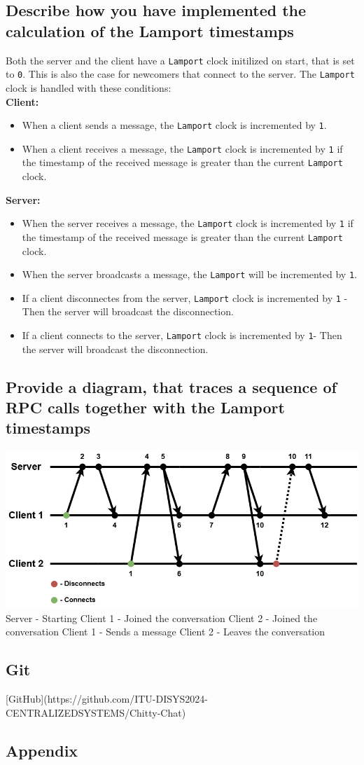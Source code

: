 \documentclass[a4paper,11pt]{article}
\begin{document}
\subsection*{Describe how you have implemented the calculation of the Lamport timestamps}
Both the server and the client have a \verb|Lamport| clock initilized on start, that is set to \verb|0|. This is also the case for newcomers that connect to the server. 
The \verb|Lamport| clock is handled with these conditions:\\
\textbf{Client:}
\begin{itemize}
    \item When a client sends a message, the \verb|Lamport| clock is incremented by \verb|1|.
    \item When a client receives a message, the \verb|Lamport| clock is incremented by \verb|1| if the timestamp of the received message is greater than the current \verb|Lamport| clock.
\end{itemize}
\textbf{Server:}
\begin{itemize}
    \item When the server receives a message, the \verb|Lamport| clock is incremented by \verb|1| if the timestamp of the received message is greater than the current \verb|Lamport| clock.
    \item When the server broadcasts a message, the \verb|Lamport| will be incremented by \verb|1|.
    \item If a client disconnectes from the server, \verb|Lamport| clock is incremented by \verb|1| - Then the server will broadcast the disconnection.
    \item If a client connects to the server, \verb|Lamport| clock is incremented by \verb|1|- Then the server will broadcast the disconnection.
\end{itemize}

\subsection*{Provide a diagram, that traces a sequence of RPC calls together with the Lamport timestamps}
\includegraphics[width=\textwidth]{chat.png}
Server   - Starting
Client 1 - Joined the conversation
Client 2 - Joined the conversation
Client 1 - Sends a message
Client 2 - Leaves the conversation

\subsection*{Git}
[GitHub](https://github.com/ITU-DISYS2024-CENTRALIZEDSYSTEMS/Chitty-Chat)

\subsection*{Appendix}
\end{document}
